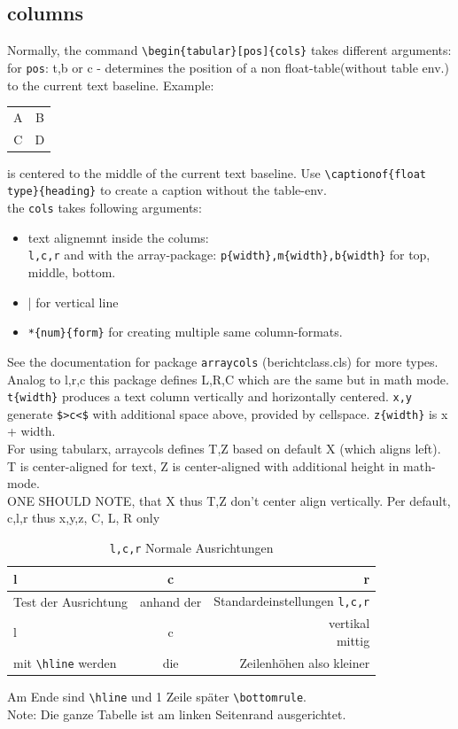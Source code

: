 \subsection{columns}
Normally, the command \verb|\begin{tabular}[pos]{cols}| takes different arguments: for \verb|pos|: t,b or c - determines the position of a non float-table(without table env.) to the current text baseline. Example: 
  \begin{tabular}[c]{c c}
    A & B \\
    C & D \\
  \end{tabular}
is centered to the middle of the current text baseline. Use \verb|\captionof{float type}{heading}| to create a caption without the table-env. \\
the \verb|cols| takes following arguments: 
\begin{itemize}
\item text alignemnt inside the colums:\\ \verb|l,c,r| and with the array-package: \verb|p{width},m{width},b{width}| for top, middle, bottom.
\item | for vertical line
\item \verb|*{num}{form}| for creating multiple same column-formats. 
\end{itemize}
See the documentation for package \verb|arraycols| (berichtclass.cls) for more types.
Analog to l,r,c this package defines L,R,C which are the same but in math mode. \verb|t{width}| produces a text column vertically and horizontally centered. \verb|x,y| generate \verb|$>c<$| with additional space above, provided by cellspace. \verb|z{width}| is x + width. \\
For using tabularx, arraycols defines T,Z based on default X (which aligns left). T is center-aligned for text, Z is center-aligned with additional height in math-mode.\\
ONE SHOULD NOTE, that X thus T,Z don't center align vertically.  Per default, c,l,r thus x,y,z, C, L, R only 
\newpage

\begin{table}[htb]
  \caption{\texttt{l,c,r} Normale Ausrichtungen}
  \begin{tabular}{l|c|r}
    \toprule
    l&c&r\\\midrule
    Test der Ausrichtung & anhand der & Standardeinstellungen \verb|l,c,r|\\\midrule
    l&c&\makecell{vertikal\\mittig}\\\hline
    mit \verb|\hline| werden & die & Zeilenhöhen also kleiner \\
    \bottomrule
  \end{tabular}
\end{table}
Am Ende sind \verb|\hline| und 1 Zeile später \verb|\bottomrule|.\\
Note: Die ganze Tabelle ist am linken Seitenrand ausgerichtet. 

